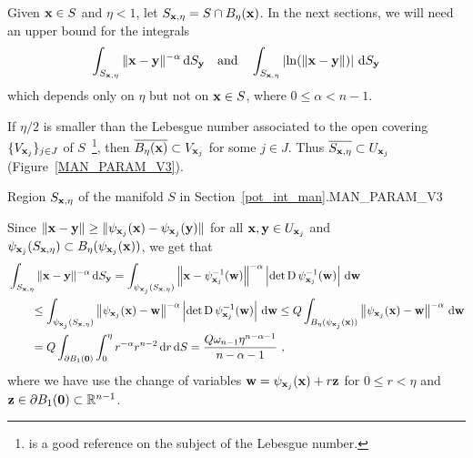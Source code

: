 Given $\mathbf{x} \in S$ and $\eta < 1$,
let $\displaystyle S_{\mathbf{x},\eta} = S \cap B_{\eta}(\mathbf{x})$.
In the next sections, we will need an upper bound for the integrals
\[
\int_{S_{\mathbf{x},\eta}} \|\mathbf{x}-\mathbf{y}\|^{-\alpha} \,\mathrm{d}{S}_{\mathbf{y}} 
\quad \text{and} \quad
\int_{S_{\mathbf{x},\eta}} \left| \ln(\|\mathbf{x}-\mathbf{y}\|) \right| \,\mathrm{d}{S}_{\mathbf{y}} 
\]
which depends only on $\eta$ but not on $\mathbf{x} \in S$, where
$0 \leq \alpha < n - 1$.

If $\eta/2$ is smaller than the Lebesgue number associated to the
open covering $\displaystyle \{ V_{\mathbf{x}_j}\}_{j\in J}$ of
$S$~\footnote{\cite{Mu} is a good reference on the subject of the Lebesgue
number.}, then
$\displaystyle \overline{B_\eta(\mathbf{x})} \subset V_{\mathbf{x}_j}$
for some $j \in J$.  Thus
$\displaystyle \overline{S_{\mathbf{x},\eta}} \subset U_{\mathbf{x}_j}$
(Figure~\ref{MAN_PARAM_V3}).

{Region $\displaystyle S_{\mathbf{x},\eta}$ of the manifold $S$ in
Section~\ref{pot_int_man}.}{MAN_PARAM_V3}

Since $\displaystyle \|\mathbf{x}-\mathbf{y}\| 
\geq \|\psi_{\mathbf{x}_j}(\mathbf{x}) - \psi_{\mathbf{x}_j}(\mathbf{y})\|$ for all
$\displaystyle \mathbf{x},\mathbf{y} \in U_{\mathbf{x}_j}$ and
$\displaystyle \psi_{\mathbf{x}_j}(S_{\mathbf{x},\eta}) \subset
B_{\eta}(\psi_{\mathbf{x}_j}(\mathbf{x}))$, we get that
\begin{align*}
&\int_{S_{\mathbf{x},\eta}} \|\mathbf{x}-\mathbf{y}\|^{-\alpha} \,\mathrm{d}{S}_{\mathbf{y}}
= \int_{\psi_{\mathbf{x}_j}(S_{\mathbf{x},\eta})}
\left\|\mathbf{x}-\psi_{\mathbf{x}_j}^{-1}(\mathbf{w})\right\|^{-\alpha}
\left| \det \operatorname{D} \psi_{\mathbf{x}_j}^{-1}(\mathbf{w})\right| \,\mathrm{d}{\mathbf{w}} \\
& \qquad
\leq \int_{\psi_{\mathbf{x}_j}(S_{\mathbf{x},\eta})}
\left\|\psi_{\mathbf{x}_j}(\mathbf{x})-\mathbf{w}\right\|^{-\alpha}
\left| \det \operatorname{D} \psi_{\mathbf{x}_j}^{-1}(\mathbf{w})\right| \,\mathrm{d}{\mathbf{w}}
\leq Q \int_{B_{\eta}(\psi_{\mathbf{x}_j}(\mathbf{x}))}
\left\|\psi_{\mathbf{x}_j}(\mathbf{x})-\mathbf{w}\right\|^{-\alpha} \,\mathrm{d}{\mathbf{w}} \\
&\qquad
= Q \int_{\partial B_1(\mathbf{0})} \int_0^\eta r^{-\alpha}
r^{n-2} \,\mathrm{d}{r} \,\mathrm{d}{S}
= \frac{ Q \omega_{n-1} \eta^{n-\alpha-1}}{n-\alpha -1} \ ,
\end{align*}
where we have use the change of variables
$\mathbf{w} = \psi_{\mathbf{x}_j}(\mathbf{x}) + r \mathbf{z}$ for
$0 \leq r < \eta$ and $\mathbf{z} \in \partial B_1(\mathbf{0}) \subset \mathbb{R}^{n-1}$.

